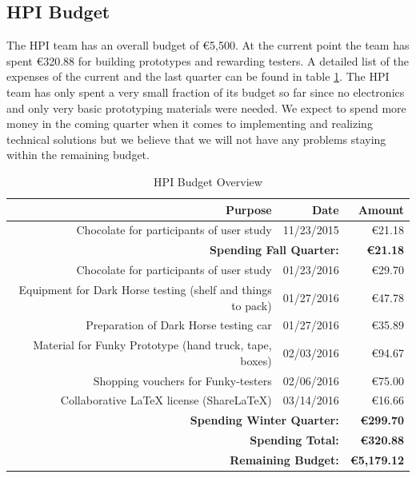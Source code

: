 \subsection{HPI Budget}

The HPI team has an overall budget of \euro5,500. At the current point the team has spent \euro320.88 for building prototypes and rewarding testers. A detailed list of the expenses of the current and the last quarter can be found in table \ref{tab:budget_hpi}. The HPI team has only spent a very small fraction of its budget so far since no electronics and only very basic prototyping materials were needed. We expect to spend more money in the coming quarter when it comes to implementing and realizing technical solutions but we believe that we will not have any problems staying within the remaining budget. 

\begin{table}[!ht]
	\centering
		\begin{tabular}{| r | r | r |}
		\hline
		\textbf{Purpose}	& \textbf{Date} & \textbf{Amount} \\
		\hline
		Chocolate for participants of user study & 11/23/2015 & \euro21.18\\ \hline
        \multicolumn{2}{|r}{\textbf{Spending Fall Quarter:}} & \textbf{\euro21.18} \\ \hline
        Chocolate for participants of user study & 01/23/2016 & \euro29.70 \\ \hline
        Equipment for Dark Horse testing (shelf and things to pack) & 01/27/2016 & \euro47.78 \\ \hline
        Preparation of Dark Horse testing car & 01/27/2016 & \euro35.89 \\ \hline
        Material for Funky Prototype (hand truck, tape, boxes) & 02/03/2016 & \euro94.67 \\ \hline
        Shopping vouchers for Funky-testers & 02/06/2016 & \euro75.00 \\ \hline
        Collaborative LaTeX license (ShareLaTeX) & 03/14/2016 & \euro16.66 \\ \hline
        \multicolumn{2}{|r}{\textbf{Spending Winter Quarter:}} & \textbf{\euro299.70} \\ \hline \hline
        \multicolumn{2}{|r}{\textbf{Spending Total:}} & \textbf{\euro320.88} \\ \hline
        \multicolumn{2}{|r}{\textbf{Remaining Budget:}} & \textbf{\euro5,179.12} \\ \hline
	\end{tabular}
	\caption{HPI Budget Overview }
	\label{tab:budget_hpi}
\end{table}
    
